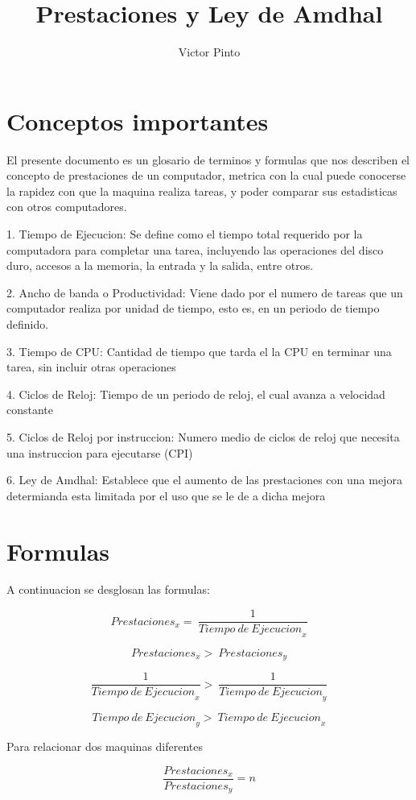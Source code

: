 \documentclass{article}
\title{Prestaciones y Ley de Amdhal}
\author{Victor Pinto}
\begin{document}
\maketitle



\section{Conceptos importantes}
El presente documento es un glosario de terminos y formulas que nos describen el concepto de prestaciones de un computador, metrica con la cual puede conocerse la rapidez con que la maquina realiza tareas, y poder comparar sus estadisticas con otros computadores.

1. Tiempo de Ejecucion: Se define como el tiempo total requerido por la computadora para completar una tarea, incluyendo las operaciones del disco duro, accesos a la memoria, la entrada y la salida, entre otros.

2. Ancho de banda o Productividad: Viene dado por el numero de tareas que un computador realiza por unidad de tiempo, esto es, en un periodo de tiempo definido.

3. Tiempo de CPU: Cantidad de tiempo que tarda el la CPU en terminar una tarea, sin incluir otras operaciones

4. Ciclos de Reloj: Tiempo de un periodo de reloj, el cual avanza a velocidad constante

5. Ciclos de Reloj por instruccion: Numero medio de ciclos de reloj que necesita una instruccion para ejecutarse (CPI)

6. Ley de Amdhal: Establece que el aumento de las prestaciones con una mejora determianda esta limitada por el uso que se le de a dicha mejora

\section{Formulas}
A continuacion se desglosan las formulas:

\[{Prestaciones}_{x} = \ \frac{1}{{Tiempo\ de\ Ejecucion}_{x}}\]

\[{Prestaciones}_{x} > \ {Prestaciones}_{y}\]

\[\frac{1}{{Tiempo\ de\ Ejecucion}_{x}} > \ \frac{1}{{Tiempo\ de\ Ejecucion}_{y}}\]

\[{Tiempo\ de\ Ejecucion}_{y} > \ {Tiempo\ de\ Ejecucion}_{x}\]

Para relacionar dos maquinas diferentes

\[\frac{{Prestaciones}_{x}}{{Prestaciones}_{y}} = n\]
\end{document}
